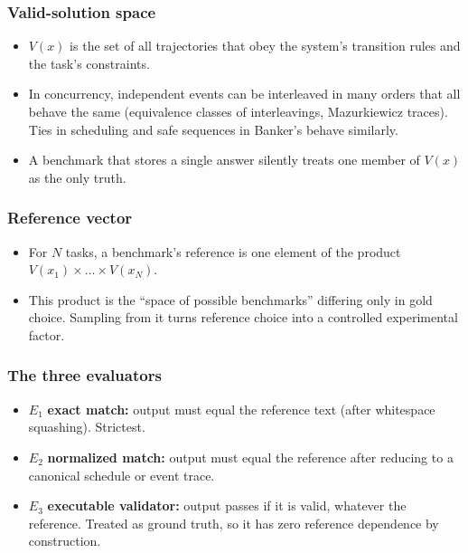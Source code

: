 \documentclass[11pt,a4paper]{article}
\newcommand{\E}[1]{E_{#1}}
\begin{document}
\subsubsection{Valid-solution space}
\begin{itemize}
\item $V(x)$ is the set of all trajectories that obey the system's transition rules and the task's constraints.
\item In concurrency, independent events can be interleaved in many orders that all behave the same (equivalence classes of interleavings, Mazurkiewicz traces). Ties in scheduling and safe sequences in Banker's behave similarly.
\item A benchmark that stores a single answer silently treats one member of $V(x)$ as the only truth.
\end{itemize}

\subsubsection{Reference vector}
\begin{itemize}
\item For $N$ tasks, a benchmark's reference is one element of the product $V(x_1)\times\dots\times V(x_N)$.
\item This product is the ``space of possible benchmarks'' differing only in gold choice. Sampling from it turns reference choice into a controlled experimental factor.
\end{itemize}

\subsubsection{The three evaluators}
\begin{itemize}
\item $\E1$ \textbf{exact match:} output must equal the reference text (after whitespace squashing). Strictest.
\item $\E2$ \textbf{normalized match:} output must equal the reference after reducing to a canonical schedule or event trace.
\item $\E3$ \textbf{executable validator:} output passes if it is valid, whatever the reference. Treated as ground truth, so it has zero reference dependence by construction.
\end{itemize}
\end{document}
